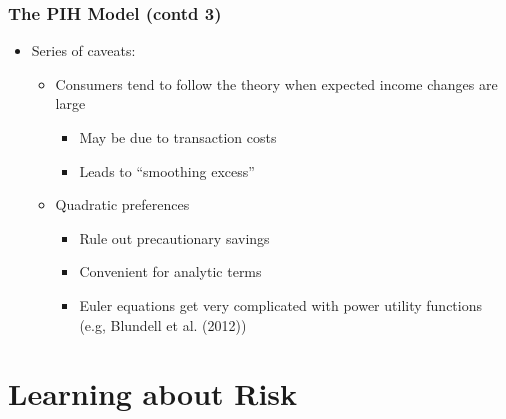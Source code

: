 \begin{frame}
	\frametitle{The PIH Model (contd 3)}
		\begin{itemize}
			\item Series of caveats:
			\begin{itemize}
				\item Consumers tend to follow the theory when expected income changes are large
					\begin{itemize}
						\item May be due to transaction costs
						\item Leads to ``smoothing excess''
					\end{itemize}
				\item Quadratic preferences
					\begin{itemize}
						\item Rule out precautionary savings
						\item Convenient for analytic terms
						\item Euler equations get very complicated with power utility functions (e.g, Blundell et al. (2012))		
					\end{itemize}
			\end{itemize}
		\end{itemize}
\end{frame}

\section{Learning about Risk}

